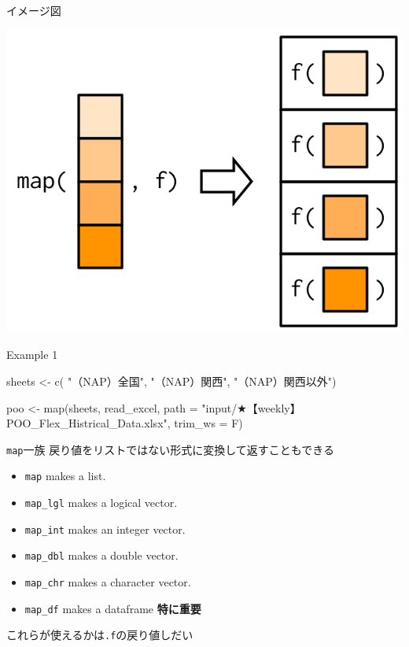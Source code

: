 \documentclass[
  ignorenonframetext,
  aspectratio=169]{beamer}
\newenvironment{Shaded}{\begin{snugshade}}{\end{snugshade}}
\newcommand{\AttributeTok}[1]{\textcolor[rgb]{0.77,0.63,0.00}{#1}}
\newcommand{\FunctionTok}[1]{\textcolor[rgb]{0.00,0.00,0.00}{#1}}
\newcommand{\NormalTok}[1]{#1}
\newcommand{\OtherTok}[1]{\textcolor[rgb]{0.56,0.35,0.01}{#1}}
\newcommand{\StringTok}[1]{\textcolor[rgb]{0.31,0.60,0.02}{#1}}
\providecommand{\tightlist}{%
  \setlength{\itemsep}{0pt}\setlength{\parskip}{0pt}}
\begin{document}
\begin{frame}{イメージ図}
\protect\hypertarget{ux30a4ux30e1ux30fcux30b8ux56f3}{}
\begin{center}\includegraphics[width=9.01in]{../img/map_advr} \end{center}
\end{frame}

\begin{frame}[fragile]{Example 1}
\protect\hypertarget{example-1}{}
\begin{Shaded}
\begin{Highlighting}[]
\NormalTok{sheets }\OtherTok{\textless{}{-}} \FunctionTok{c}\NormalTok{( }\StringTok{"（NAP）全国"}\NormalTok{,}
        \StringTok{"（NAP）関西"}\NormalTok{,}
        \StringTok{"（NAP）関西以外"}\NormalTok{)}

\NormalTok{poo }\OtherTok{\textless{}{-}} \FunctionTok{map}\NormalTok{(sheets,}
\NormalTok{       read\_excel,}
       \AttributeTok{path =} \StringTok{"input/★【weekly】POO\_Flex\_Histrical\_Data.xlsx"}\NormalTok{,}
       \AttributeTok{trim\_ws =}\NormalTok{ F)}
\end{Highlighting}
\end{Shaded}
\end{frame}

\begin{frame}[fragile]{\texttt{map}一族}
\protect\hypertarget{mapux4e00ux65cf}{}
戻り値をリストではない形式に変換して返すこともできる

\begin{itemize}
\tightlist
\item
  \texttt{map} makes a list.
\item
  \texttt{map\_lgl} makes a logical vector.
\item
  \texttt{map\_int} makes an integer vector.
\item
  \texttt{map\_dbl} makes a double vector.
\item
  \texttt{map\_chr} makes a character vector.
\item
  \texttt{map\_df} makes a dataframe \textbf{特に重要}
\end{itemize}

これらが使えるかは\texttt{.f}の戻り値しだい
\end{frame}
\end{document}
